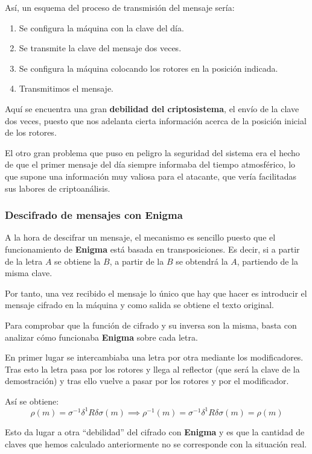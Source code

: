 \documentclass[nochap]{apuntesURJC}
\begin{document}
Así, un esquema del proceso de transmisión del mensaje sería:
\begin{enumerate}
\item Se configura la máquina con la clave del día.
\item Se transmite la clave del mensaje dos veces.
\item Se configura la máquina colocando los rotores en la posición indicada.
\item Transmitimos el mensaje.
\end{enumerate}

Aquí se encuentra una gran \textbf{debilidad del criptosistema}, el envío de la clave dos veces, puesto que nos adelanta cierta información acerca de la posición inicial de los rotores.

El otro gran problema que puso en peligro la seguridad del sistema era el hecho de que el primer mensaje del día siempre informaba del tiempo atmosférico, lo que supone una información muy valiosa para el atacante, que vería facilitadas sus labores de criptoanálisis.


\subsubsection{Descifrado de mensajes con Enigma}
A la hora de descifrar un mensaje, el mecanismo es sencillo puesto que el funcionamiento de \textbf{Enigma} está basada en transposiciones. Es decir, si a partir de la letra $A$ se obtiene la $B$, a partir de la $B$ se obtendrá la $A$, partiendo de la misma clave.

Por tanto, una vez recibido el mensaje lo único que hay que hacer es introducir el mensaje cifrado en la máquina y como salida se obtiene el texto original.

Para comprobar que la función de cifrado y su inversa son la misma, basta con analizar cómo funcionaba \textbf{Enigma} sobre cada letra.

En primer lugar se intercambiaba una letra por otra mediante los modificadores. Tras esto la letra pasa por los rotores y llega al reflector (que será la clave de la demostración) y tras ello vuelve a pasar por los rotores y por el modificador.

Así se obtiene:
\[\rho(m) = σ^{-1}δ^{1}Rδσ(m) \implies \rho^{-1}(m) = σ^{-1}δ^{1}Rδσ(m) = \rho(m)\]

Esto da lugar a otra ``debilidad'' del cifrado con \textbf{Enigma} y es que la cantidad de claves que hemos calculado anteriormente no se corresponde con la situación real.
\end{document}
